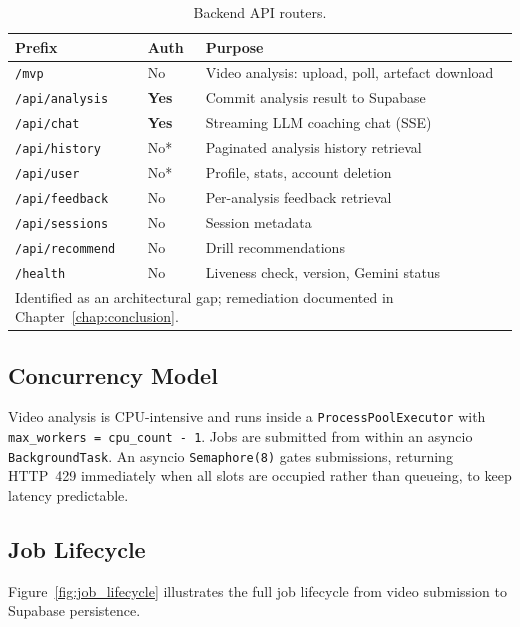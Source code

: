\begin{table}[H]
  \centering
  \caption{Backend API routers.}
  \label{tab:routers}
  \begin{tabularx}{\textwidth}{llX}
    \toprule
    \textbf{Prefix} & \textbf{Auth} & \textbf{Purpose} \\
    \midrule
    \lstinline|/mvp| & No & Video analysis: upload, poll, artefact download \\
    \lstinline|/api/analysis| & \textbf{Yes} & Commit analysis result to Supabase \\
    \lstinline|/api/chat| & \textbf{Yes} & Streaming LLM coaching chat (SSE) \\
    \lstinline|/api/history| & No* & Paginated analysis history retrieval \\
    \lstinline|/api/user| & No* & Profile, stats, account deletion \\
    \lstinline|/api/feedback| & No & Per-analysis feedback retrieval \\
    \lstinline|/api/sessions| & No & Session metadata \\
    \lstinline|/api/recommend| & No & Drill recommendations \\
    \lstinline|/health| & No & Liveness check, version, Gemini status \\
    \bottomrule
    \multicolumn{3}{l}{\small * Identified as an architectural gap; remediation documented in Chapter~\ref{chap:conclusion}.}
  \end{tabularx}
\end{table}

\subsection{Concurrency Model}

Video analysis is CPU-intensive and runs inside a \lstinline|ProcessPoolExecutor| with \lstinline|max_workers = cpu_count - 1|. Jobs are submitted from within an asyncio \lstinline|BackgroundTask|. An asyncio \lstinline|Semaphore(8)| gates submissions, returning HTTP~429 immediately when all slots are occupied rather than queueing, to keep latency predictable.

\subsection{Job Lifecycle}

Figure~\ref{fig:job_lifecycle} illustrates the full job lifecycle from video submission to Supabase persistence.

